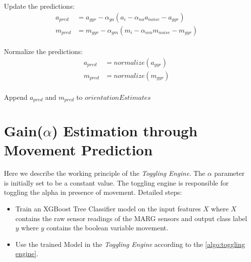 \documentclass{iutbscthesis}
\begin{document}
\begin{algorithm}
{Update the predictions:
\begin{align*}
    a_{pred} &= a_{gyr} - \alpha_{ga}(a_i - \alpha_{na}a_{noise} - a_{gyr}) \\
    m_{pred} &= m_{gyr} - \alpha_{gm}(m_i - \alpha_{nm}m_{noise} - m_{gyr})
\end{align*}\\

Normalize  the predictions:
\begin{align*}
    a_{pred} &= normalize(a_{gyr}) \\
    m_{pred} &= normalize(m_{gyr})
\end{align*}\\
Append $a_{pred}$ and $m_{pred}$ to $orientationEstimates$\\
}
\end{algorithm}



\newpage
\section{Gain($\alpha$) Estimation through Movement Prediction}\label{section:MovementPred}

Here we describe the working principle of the \textit{Toggling Engine}. The $\alpha$ parameter is initially set to be a constant value. The toggling engine is responsible for toggling the alpha in presence of movement. Detailed steps:
\begin{itemize}
    \item Train an XGBoost Tree Classifier\cite{chen2016xgboost} model on the input features $X$ where $X$ contains the raw sensor readings of the MARG sensors and output class label $y$ where $y$ contains the boolean variable movement.
    \item Use the trained Model in the \textit{Toggling Engine} according to the \autoref{algo:toggling engine}.
\end{itemize}

\begin{algorithm}[H]
\SetAlgoLined
\DontPrintSemicolon
{}


\caption{Toggling Engine} \label{algo:toggling engine}
\end{algorithm}
\end{document}
